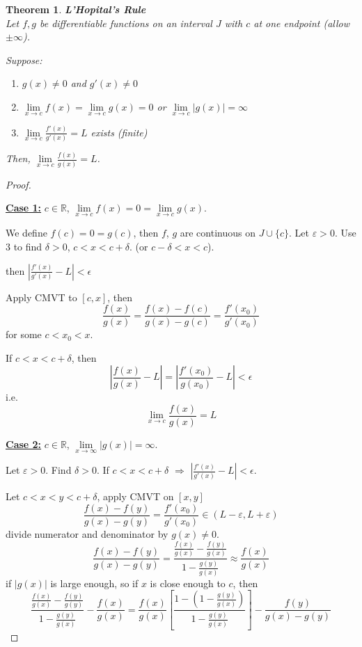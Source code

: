 \documentclass[12pt]{article}
\newcommand{\abs}[1]{\left| #1 \right|}
\theoremstyle{plain}
\newtheorem{theorem}{Theorem}[subsection]
\newcommand{\ep}{\varepsilon}
\newcommand{\dlim}{\displaystyle\lim\limits}
\begin{document}
	\begin{theorem}{\textbf{L'Hopital's Rule}}\\
		Let $f,g$ be differentiable functions on an interval $J$ with
		$c$ at one endpoint (allow $\pm \infty$). 

		Suppose:
		\begin{enumerate}
			\item $g(x)\neq 0$ and $g'(x) \neq 0$
			\item $\dlim_{x\to c} f(x) = \dlim_{x\to c}g(x) = 0$ or 
			$\dlim_{x\to c}\abs{g(x)} = \infty$
		\item $\dlim_{x\to c} \frac{f'(x)}{g'(x)} = L$ exists (finite)
		\end{enumerate}
		Then, $\dlim_{x\to c} \frac{f(x)}{g(x)} = L$.
	\end{theorem}
	\begin{proof}
		$ $
		
		\textbf{\underline{Case 1:}}
		$c\in\mathbb{R}$, $\dlim_{x\to c} f(x) = 0 = \dlim_{x\to c} g(x)$. 

		We define $f(c) = 0 = g(c)$, then $f$, $g$ are continuous 
		on $J \cup \{c\}$.
		Let $\ep > 0$. Use $3$ to find $\delta>0$, $c < x < c+\delta$. 
	 (or $c-\delta<x<c$).

	 then $\abs{\frac{f'(x)}{g'(x)}-L}<\epsilon$

	 Apply CMVT to $[c, x]$, then 
	\[
		\frac{f(x)}{g(x)} = \frac{f(x)-f(c)}{g(x)-g(c)} = \frac{f'(x_0)}{g'(x_0)}
	\]
	for some $c<x_0<x$.

	If $c < x < c+\delta$, then 
	\[
		\abs{\frac{f(x)}{g(x)}-L}=\abs{\frac{f'(x_0)}{g(x_0)}-L} <\epsilon
	\]
	i.e. \[
		\dlim_{x\to c}\frac{f(x)}{g(x)} = L 
	\]
	
	\textbf{\underline{Case 2:}} $c\in\mathbb{R}$, 
	$\dlim_{x\to \infty} \abs{g(x)}= \infty$.

	Let $\ep > 0$. Find $\delta > 0$. If $c < x < c + \delta$ $\Rightarrow$
	$\abs{\frac{f'(x)}{g'(x)} - L} < \epsilon$. 

	Let $c < x < y < c+\delta$, apply CMVT on $[x, y]$
	\[
			\frac{f(x)-f(y)}{g(x)-g(y)} = \frac{f'(x_0)}{g'(x_0)}\in(L-\ep, L+\ep)
	\]
	divide numerator and denominator by $g(x)\neq 0$. 
	\[
		\frac{f(x)-f(y)}{g(x)-g(y)} 
		=\dfrac{\frac{f(x)}{g(x)} - \frac{f(y)}{g(x)}}{1-\frac{g(y)}{g(x)}}		
		\approx \frac{f(x)}{g(x)} 
	\]
	if $\abs{g(x)}$ is large enough, so if $x$ is close enough to $c$, then 
	\[
		\frac{\frac{f(x)}{g(x)}-\frac{f(y)}{g(y)}}
		{1-\frac{g(y)}{g(x)}}-\frac{f(x)}{g(x)}
        =\frac{f(x)}{g(x)} 
        \left[\frac{1-(1-\frac{g(y)}{g(x)})}{1-\frac{g(y)}{g(x)}}\right]
		-\frac{f(y)}{g(x)-g(y)}
	\]


\end{proof}
\end{document}
